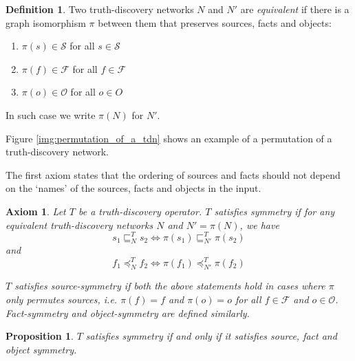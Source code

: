 \documentclass{article}
\theoremstyle{definition} \newtheorem{definition}{Definition}
\theoremstyle{definition} \newtheorem{example}{Example}
\theoremstyle{plain} \newtheorem{axiom}{Axiom}
\theoremstyle{plain} \newtheorem*{remark}{Remark}
\theoremstyle{remark} \newtheorem*{notation}{Notation}
\theoremstyle{plain} \newtheorem{lemma}{Lemma}
\theoremstyle{plain} \newtheorem{proposition}{Proposition}
\renewcommand{\S}{\mathcal{S}}  %
\renewcommand{\O}{\mathcal{O}}  %
\newcommand{\F}{\mathcal{F}}
\newcommand{\sle}{\sqsubseteq}
\newcommand{\fle}{\preceq}
\begin{document}
\begin{definition}
Two truth-discovery networks $N$ and $N'$ are \emph{equivalent} if there is a
graph isomorphism $\pi$ between them that preserves sources, facts and objects:
\begin{enumerate}
\item $\pi(s) \in \S$ for all $s \in \S$
\item $\pi(f) \in \F$ for all $f \in \F$
\item $\pi(o) \in \O$ for all $o \in O$
\end{enumerate}

In such case we write $\pi(N)$ for $N'$.
\end{definition}

Figure \ref{img:permutation_of_a_tdn} shows an example of a permutation of a
truth-discovery network.

The first axiom states that the ordering of sources and facts should not depend
on the `names' of the sources, facts and objects in the input.

\begin{axiom}
\label{axiom:symmetry}
Let $T$ be a truth-discovery operator. $T$ satisfies \emph{symmetry} if for
any equivalent truth-discovery networks $N$ and $N' = \pi(N)$, we have
$$ s_1 \sle_N^T s_2 \iff \pi(s_1) \sle_{N'}^T \pi(s_2) $$
and
$$ f_1 \fle_N^T f_2 \iff \pi(f_1) \fle_{N'}^T \pi(f_2) $$

$T$ satisfies \emph{source-symmetry} if both the above statements hold in cases
where $\pi$ only permutes sources, i.e. $\pi(f)=f$ and $\pi(o)=o$ for all $f
\in \F$ and $o \in \O$. \emph{Fact-symmetry} and \emph{object-symmetry} are
defined similarly.
\end{axiom}

\begin{proposition}
$T$ satisfies symmetry if and only if it satisfies source, fact and object
symmetry.
\end{proposition}
\end{document}

